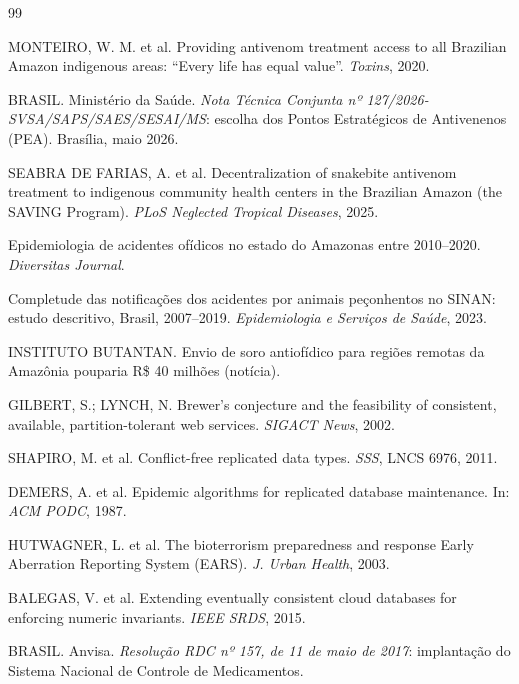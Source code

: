 \documentclass[a4paper,12pt]{article}
\begin{document}
\footnotesize
\begin{thebibliography}{99}
\setlength{\itemsep}{0pt}

 MONTEIRO, W. M. et al. Providing antivenom treatment
  access to all Brazilian Amazon indigenous areas: ``Every life has equal
  value''. \textit{Toxins}, 2020.

 BRASIL. Ministério da Saúde. \textit{Nota Técnica Conjunta
  nº 127/2026-SVSA/SAPS/SAES/SESAI/MS}: escolha dos Pontos Estratégicos de
  Antivenenos (PEA). Brasília, maio 2026.

 SEABRA DE FARIAS, A. et al. Decentralization of
  snakebite antivenom treatment to indigenous community health centers in the
  Brazilian Amazon (the SAVING Program). \textit{PLoS Neglected Tropical
  Diseases}, 2025.

 Epidemiologia de acidentes ofídicos no estado do
  Amazonas entre 2010--2020. \textit{Diversitas Journal}.

 Completude das notificações dos acidentes por
  animais peçonhentos no SINAN: estudo descritivo, Brasil, 2007--2019.
  \textit{Epidemiologia e Serviços de Saúde}, 2023.

 INSTITUTO BUTANTAN. Envio de soro antiofídico para
  regiões remotas da Amazônia pouparia R\$ 40 milhões (notícia).

 GILBERT, S.; LYNCH, N. Brewer's conjecture and the
  feasibility of consistent, available, partition-tolerant web services.
  \textit{SIGACT News}, 2002.

 SHAPIRO, M. et al. Conflict-free replicated data
  types. \textit{SSS}, LNCS 6976, 2011.

 DEMERS, A. et al. Epidemic algorithms for replicated
  database maintenance. In: \textit{ACM PODC}, 1987.

 HUTWAGNER, L. et al. The bioterrorism preparedness
  and response Early Aberration Reporting System (EARS). \textit{J. Urban Health}, 2003.

 BALEGAS, V. et al. Extending eventually consistent
  cloud databases for enforcing numeric invariants. \textit{IEEE SRDS}, 2015.

 BRASIL. Anvisa. \textit{Resolução RDC nº 157, de 11 de maio
  de 2017}: implantação do Sistema Nacional de Controle de Medicamentos.


\end{thebibliography}
\end{document}
